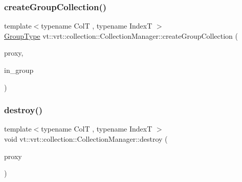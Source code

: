 \mbox{\label{structvt_1_1vrt_1_1collection_1_1_collection_manager_a05de48c4386d84532b19a96b0cefc172}} 
\subsubsection{\texorpdfstring{create\+Group\+Collection()}{createGroupCollection()}}
{\footnotesize\ttfamily template$<$typename ColT , typename IndexT $>$ \\
\hyperlink{namespacevt_a27b5e4411c9b6140c49100e050e2f743}{Group\+Type} vt\+::vrt\+::collection\+::\+Collection\+Manager\+::create\+Group\+Collection (\begin{DoxyParamCaption}\item[{\hyperlink{namespacevt_a1b417dd5d684f045bb58a0ede70045ac}{Virtual\+Proxy\+Type} const \&}]{proxy,  }\item[{bool const}]{in\+\_\+group }\end{DoxyParamCaption})}

\mbox{\label{structvt_1_1vrt_1_1collection_1_1_collection_manager_ae6e458293d04d8b29697fa0584c84c67}} 
\subsubsection{\texorpdfstring{destroy()}{destroy()}}
{\footnotesize\ttfamily template$<$typename ColT , typename IndexT $>$ \\
void vt\+::vrt\+::collection\+::\+Collection\+Manager\+::destroy (\begin{DoxyParamCaption}\item[{\hyperlink{structvt_1_1vrt_1_1collection_1_1_collection_manager_a56458ed7f9bb22b631b9b3a745f42f94}{Collection\+Proxy\+Wrap\+Type}$<$ ColT, IndexT $>$ const \&}]{proxy }\end{DoxyParamCaption})}


